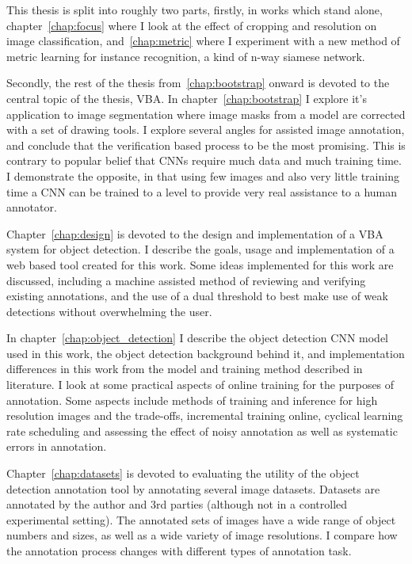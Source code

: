 This thesis is split into roughly two parts, firstly, in works which stand alone, chapter~\ref{chap:focus} where I look at the effect of cropping and resolution on image classification, and~\ref{chap:metric} where I experiment with a new method of metric learning for instance recognition, a kind of n-way siamese network. 

Secondly, the rest of the thesis from~\ref{chap:bootstrap} onward is devoted to the central topic of the thesis, \gls{VBA}. In chapter~\ref{chap:bootstrap} I explore it's application to image segmentation where image masks from a model are corrected with a set of drawing tools. I explore several angles for assisted image annotation, and conclude that the verification based process to be the most promising. This is contrary to popular belief that \gls{CNN}s require much data and much training time. I demonstrate the opposite, in that using few images and also very little training time a \gls{CNN} can be trained to a level to provide very real assistance to a human annotator. 

Chapter~\ref{chap:design} is devoted to the design and implementation of a \gls{VBA} system for object detection. I describe the goals, usage and implementation of a web based tool created for this work. Some ideas implemented for this work are discussed, including a machine assisted method of reviewing and verifying existing annotations, and the use of a dual threshold to best make use of weak detections without overwhelming the user.

In chapter~\ref{chap:object_detection} I describe the object detection \gls{CNN} model used in this work, the object detection background behind it, and implementation differences in this work from the model and training method described in literature. I look at some practical aspects of online training for the purposes of annotation. Some aspects include methods of training and inference for high resolution images and the trade-offs, incremental training online, cyclical learning rate scheduling and assessing the effect of noisy annotation as well as systematic errors in annotation. 

Chapter~\ref{chap:datasets} is devoted to evaluating the utility of the object detection annotation tool by annotating several image datasets. Datasets are annotated by the author and 3rd parties (although not in a controlled experimental setting). The annotated sets of images have a wide range of object numbers and sizes, as well as a wide variety of image resolutions. I compare how the annotation process changes with different types of annotation task. 

